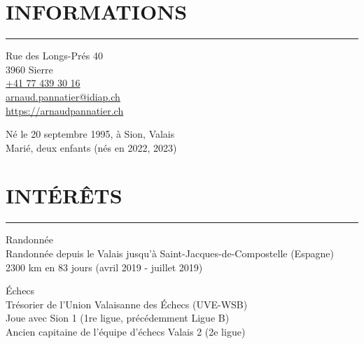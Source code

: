 \documentclass{article}
\let\oldhrule\hrule
\renewcommand{\hrule}{\color{lightgray}\oldhrule\color{black}}
\newcommand{\rubric}[1]{
    \color{mediumgray}
    \section*{\montserratlight \large \MakeUppercase{#1}} 
    \hrule
    \vspace{4mm}
    \raggedright
}
\begin{document}
\begin{minipage}[t]{0.3\textwidth}
  \rubric{Informations}

  \color{deepgray} \small
  Rue des Longs-Prés 40 \\
  3960 Sierre \\

  \href{tel:+41774393016}{+41 77 439 30 16} \\
  \href{mailto:arnaud.pannatier@idiap.ch}{arnaud.pannatier@idiap.ch} \\
  \href{https://arnaudpannatier.ch}{https://arnaudpannatier.ch}  \\

  \vspace{4mm}

  Né le 20 septembre 1995, à Sion, Valais \\
  Marié, deux enfants (nés en 2022, 2023)

\end{minipage}\hfill
\begin{minipage}[t]{0.65\textwidth}
  \rubric{Intérêts}
  \normalsize
  \color{deepgray}
  Randonnée \\
  \color{mediumgray} \small
  Randonnée depuis le Valais jusqu'à Saint-Jacques-de-Compostelle (Espagne) \\
  2300 km en 83 jours (avril 2019 - juillet 2019)
  \vspace{3mm}

  \color{deepgray}
  \normalsize
  Échecs \\
  \color{mediumgray} \small
  Trésorier de l'Union Valaisanne des Échecs (UVE-WSB) \\
  Joue avec Sion 1 (1re ligue, précédemment Ligue B) \\
  Ancien capitaine de l'équipe d'échecs Valais 2 (2e ligue)
\end{minipage}
\end{document}
